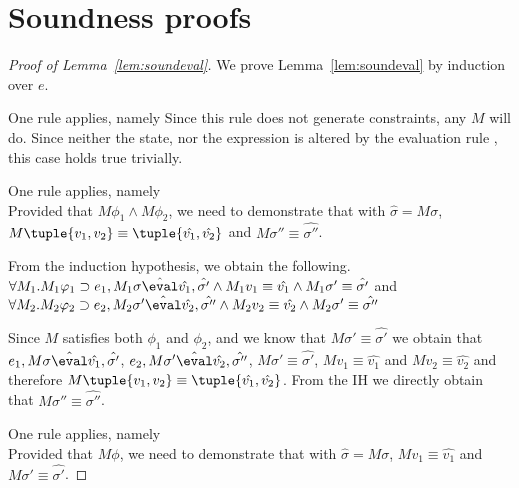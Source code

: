 


\section{Soundness proofs}
\label{sec:soundness-proofs}

\begin{proof}[Proof of Lemma~\ref{lem:soundeval}]
  We prove Lemma~\ref{lem:soundeval} by induction over $e$.

  {One rule applies, namely 
  Since this rule does not generate constraints, any $M$ will do.
  Since neither the state, nor the expression is altered by the evaluation rule ,
  this case holds true trivially.
  }

  {One rule applies, namely \\
  Provided that $M\phi_1\wedge M\phi_2$,
  we need to demonstrate that   with $\hat{\sigma}=M\sigma$,
  $M\tuple{v_1,v_2} \equiv \tuple{\hat{v_1},\hat{v_2}}$ and $M\sigma''\equiv\hat{\sigma''}$.

  From the induction hypothesis, we obtain the following.\\
  $\forall M_1 .  M_1\phi_1 \implies e_1, M_1\sigma \hat{\eval}\hat{v_1},\hat{\sigma'}\land  M_1v_1\equiv \hat{v_1} \land  M_1\sigma'\equiv\hat{\sigma'}$ and
  $\forall M_2 . M_2\phi_2 \implies e_2,M_2\sigma' \hat{\eval}\hat{v_2},\hat{\sigma''}\land M_2v_2\equiv \hat{v_2} \wedge M_2\sigma'\equiv\hat{\sigma''}$

  Since $M$ satisfies both $\phi_1$ and $\phi_2$,
  and we know that $M\sigma'\equiv \hat{\sigma'}$
  we obtain that $e_1,M\sigma \hat{\eval}\hat{v_1},\hat{\sigma'}$,
  $e_2,M\sigma'\hat{\eval}\hat{v_2},\hat{\sigma''}$, $M\sigma'\equiv \hat{\sigma'}$,
 $M v_1\equiv \hat{v_1}$ and $M v_2 \equiv \hat{v_2}$ and therefore $M\tuple{v_1,v_2} \equiv \tuple{\hat{v_1},\hat{v_2}}$.
  From the IH we directly obtain that $M \sigma'' \equiv\hat{\sigma''}$.
  }

{
  One rule applies, namely \\
  Provided that $M\phi$,
  we need to demonstrate that  with $\hat{\sigma}=M\sigma$,
  $M v_1\equiv \hat{v_1}$ and $M\sigma'\equiv\hat{\sigma'}$.

}
\end{proof}

